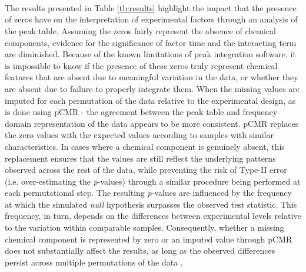 \documentclass[preprint,12pt]{elsarticle}
\begin{document}
\begin{table} %
 \\
 \\ 
 \\

\caption{Results of GLM analyses of the experimental factors versus the different representations of the multivariate data. Beginning with the un-altered peak table, followed by the zero-handling GLM with permutational conditional mean replacement (pCMR) \cite{pCMR}, and then the mean-centred frequency domain GLM analysis which contains no missing information. \textit{p}-values below 0.05 are shown in bold, and the similarity between the analysis of the data performed using missing-value imputation, and the FFT-ASCA method are highlighted in blue.}
\label{tb:results}

\end{table}

The results presented in Table \ref{tb:results} highlight the impact that the presence of zeros have on the interpretation of experimental factors through an analysis of the peak table. Assuming the zeros fairly represent the absence of chemical components, evidence for the significance of factor time and the interacting term are diminished. Because of the known limitations of peak integration software, it is impossible to know if the presence of these zeros truly represent chemical features that are absent due to meaningful variation in the data, or whether they are absent due to failure to properly integrate them. When the missing values are imputed for each permutation of the data relative to the experimental design, as is done using pCMR - the agreement between the peak table and frequency domain representation of the data appears to be more consistent. pCMR replaces the zero values with the expected values according to samples with similar characteristics. In cases where a chemical component is genuinely absent, this replacement ensures that the values are still reflect the underlying patterns observed across the rest of the data, while preventing the risk of Type-II error (i.e. over-estimating the \textit{p}-values) through a similar procedure being performed at each permutational step. The resulting \textit{p}-values are influenced by the frequency at which the simulated \textit{null} hypothesis surpasses the observed test statistic. This frequency, in turn, depends on the differences between experimental levels relative to the variation within comparable samples. Consequently, whether a missing chemical component is represented by zero or an imputed value through pCMR does not substantially affect the results, as long as the observed differences persist across multiple permutations of the data \cite{merchanskaya2024considerations}.
\end{document}
